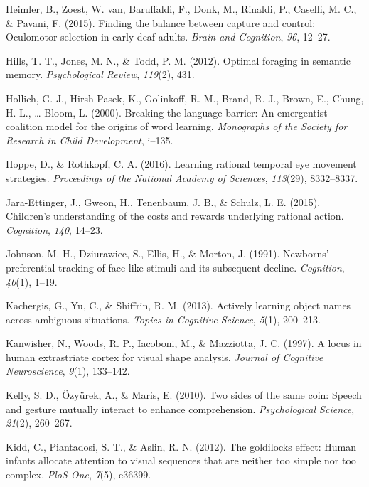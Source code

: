 \documentclass[oneside]{report}
\begin{document}
\hypertarget{ref-heimler2015finding}{}
Heimler, B., Zoest, W. van, Baruffaldi, F., Donk, M., Rinaldi, P.,
Caselli, M. C., \& Pavani, F. (2015). Finding the balance between
capture and control: Oculomotor selection in early deaf adults.
\emph{Brain and Cognition}, \emph{96}, 12--27.

\hypertarget{ref-hills2012optimal}{}
Hills, T. T., Jones, M. N., \& Todd, P. M. (2012). Optimal foraging in
semantic memory. \emph{Psychological Review}, \emph{119}(2), 431.

\hypertarget{ref-hollich2000breaking}{}
Hollich, G. J., Hirsh-Pasek, K., Golinkoff, R. M., Brand, R. J., Brown,
E., Chung, H. L., \ldots{} Bloom, L. (2000). Breaking the language
barrier: An emergentist coalition model for the origins of word
learning. \emph{Monographs of the Society for Research in Child
Development}, i--135.

\hypertarget{ref-hoppe2016learning}{}
Hoppe, D., \& Rothkopf, C. A. (2016). Learning rational temporal eye
movement strategies. \emph{Proceedings of the National Academy of
Sciences}, \emph{113}(29), 8332--8337.

\hypertarget{ref-jara2015children}{}
Jara-Ettinger, J., Gweon, H., Tenenbaum, J. B., \& Schulz, L. E. (2015).
Children's understanding of the costs and rewards underlying rational
action. \emph{Cognition}, \emph{140}, 14--23.

\hypertarget{ref-johnson1991newborns}{}
Johnson, M. H., Dziurawiec, S., Ellis, H., \& Morton, J. (1991).
Newborns' preferential tracking of face-like stimuli and its subsequent
decline. \emph{Cognition}, \emph{40}(1), 1--19.

\hypertarget{ref-kachergis2013actively}{}
Kachergis, G., Yu, C., \& Shiffrin, R. M. (2013). Actively learning
object names across ambiguous situations. \emph{Topics in Cognitive
Science}, \emph{5}(1), 200--213.

\hypertarget{ref-kanwisher1997locus}{}
Kanwisher, N., Woods, R. P., Iacoboni, M., \& Mazziotta, J. C. (1997). A
locus in human extrastriate cortex for visual shape analysis.
\emph{Journal of Cognitive Neuroscience}, \emph{9}(1), 133--142.

\hypertarget{ref-kelly2010two}{}
Kelly, S. D., Özyürek, A., \& Maris, E. (2010). Two sides of the same
coin: Speech and gesture mutually interact to enhance comprehension.
\emph{Psychological Science}, \emph{21}(2), 260--267.

\hypertarget{ref-kidd2012goldilocks}{}
Kidd, C., Piantadosi, S. T., \& Aslin, R. N. (2012). The goldilocks
effect: Human infants allocate attention to visual sequences that are
neither too simple nor too complex. \emph{PloS One}, \emph{7}(5),
e36399.
\end{document}
